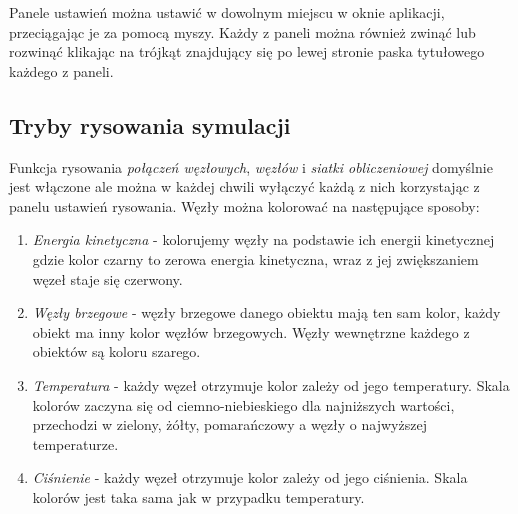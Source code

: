\documentclass[12pt, letterpaper]{report}
\begin{document}
    Panele ustawień można ustawić w dowolnym miejscu w oknie aplikacji, przeciągając je za pomocą myszy.
    Każdy z paneli można również zwinąć lub rozwinąć klikając na trójkąt znajdujący się po lewej 
    stronie paska tytułowego każdego z paneli.

    \clearpage
    \subsection{Tryby rysowania symulacji}
    Funkcja rysowania \emph{połączeń węzłowych}, \emph{węzłów} i \emph{siatki obliczeniowej} domyślnie 
    jest włączone ale można w każdej chwili wyłączyć każdą z nich korzystając z panelu ustawień rysowania.
    Węzły można kolorować na następujące sposoby:

    \begin{enumerate}
        \item \emph{Energia kinetyczna} - kolorujemy węzły na podstawie ich energii kinetycznej 
        gdzie kolor czarny to zerowa energia kinetyczna, wraz z jej zwiększaniem węzeł staje się czerwony.

        \item \emph{Węzły brzegowe} - węzły brzegowe danego obiektu mają ten sam kolor,
        każdy obiekt ma inny kolor węzłów brzegowych. Węzły wewnętrzne każdego z obiektów są koloru szarego.

        \item \emph{Temperatura} - każdy węzeł otrzymuje kolor zależy od jego temperatury. 
        Skala kolorów zaczyna się od ciemno-niebieskiego dla najniższych wartości, 
        przechodzi w zielony, żółty, pomarańczowy a węzły o najwyższej temperaturze.

        \item \emph{Ciśnienie} - każdy węzeł otrzymuje kolor zależy od jego ciśnienia. 
        Skala kolorów jest taka sama jak w przypadku temperatury.
    \end{enumerate}
\end{document}
